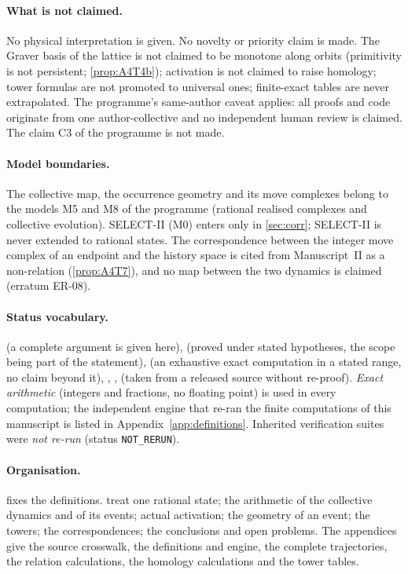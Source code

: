 \paragraph{What is not claimed.}
No physical interpretation is given. No novelty or priority claim is made. The Graver basis of the lattice is not claimed to be monotone along orbits (primitivity is not persistent; \cref{prop:A4T4b}); activation is not claimed to raise homology; tower formulas are not promoted to universal ones; finite-exact tables are never extrapolated. The programme's same-author caveat applies: all proofs and code originate from one author-collective and no independent human review is claimed. The claim C3 of the programme is not made.

\paragraph{Model boundaries.}
The collective map, the occurrence geometry and its move complexes belong to the models M5 and M8 of the programme (rational realised complexes and collective evolution). SELECT-II (M0) enters only in \cref{sec:corr}; SELECT-II is never extended to rational states. The correspondence between the integer move complex of an endpoint and the history space is cited from Manuscript~II as a non-relation (\cref{prop:A4T7}), and no map between the two dynamics is claimed (erratum ER-08).

\paragraph{Status vocabulary.}
 (a complete argument is given here),  (proved under stated hypotheses, the scope being part of the statement),  (an exhaustive exact computation in a stated range, no claim beyond it), , ,  (taken from a released source without re-proof). \emph{Exact arithmetic} (integers and fractions, no floating point) is used in every computation; the independent engine that re-ran the finite computations of this manuscript is listed in Appendix~\ref{app:definitions}. Inherited verification suites were \emph{not re-run} (status \texttt{NOT\_RERUN}).

\paragraph{Organisation.}  fixes the definitions.  treat one rational state;  the arithmetic of the collective dynamics and of its events;  actual activation;  the geometry of an event;  the towers;  the correspondences;  the conclusions and open problems. The appendices give the source crosswalk, the definitions and engine, the complete trajectories, the relation calculations, the homology calculations and the tower tables.

